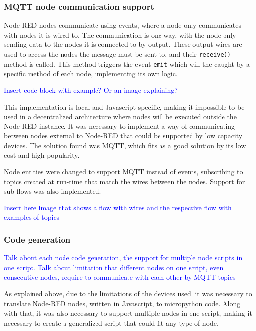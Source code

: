 \subsubsection{MQTT node communication support}\label{sec:mqtt_support}

Node-RED nodes communicate using events, where a node only communicates with nodes it is wired to. The communication is one way, with the node only sending data to the nodes it is connected to by output. These output wires are used to access the nodes the message must be sent to, and their \texttt{receive()} method is called. This method triggers the event \texttt{emit} which will the caught by a specific method of each node, implementing its own logic.

\textcolor{blue}{Insert code block with example? Or an image explaining?}

This implementation is local and Javascript specific, making it impossible to be used in a decentralized architecture where nodes will be executed outside the Node-RED instance. It was necessary to implement a way of communicating between nodes external to Node-RED that could be supported by low capacity devices. The solution found was MQTT, which fits as a good solution by its low cost and high popularity.

Node entities were changed to support MQTT instead of events, subscribing to topics created at run-time that match the wires between the nodes. Support for sub-flows was also implemented.

\textcolor{blue}{Insert here image that shows a flow with wires and the respective flow with examples of topics}

\subsubsection{Code generation}\label{sec:code_generation}

\textcolor{blue}{Talk about each node code generation, the support for multiple node scripts in one script. Talk about limitation that different nodes on one script, even consecutive nodes, require to communicate with each other by MQTT topics}

As explained above, due to the limitations of the devices used, it was necessary to translate Node-RED nodes, written in Javascript, to micropython code. Along with that, it was also necessary to support multiple nodes in one script, making it necessary to create a generalized script that could fit any type of node.

